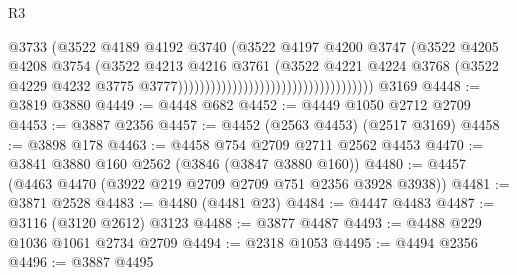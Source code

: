 \begin{lexlean}{R3}
\begin{coremodule}
                                                                @3733
                                                                (@3522
                                                                  @4189
                                                                  @4192
                                                                  @3740
                                                                  (@3522
                                                                    @4197
                                                                    @4200
                                                                    @3747
                                                                    (@3522
                                                                      @4205
                                                                      @4208
                                                                      @3754
                                                                      (@3522
                                                                        @4213
                                                                        @4216
                                                                        @3761
                                                                        (@3522
                                                                          @4221
                                                                          @4224
                                                                          @3768
                                                                          (@3522
                                                                            @4229
                                                                            @4232
                                                                            @3775
                                                                            @3777))))))))))))))))))))))))))))))))))))
    @3169
@4448 := @3819 @3880
@4449 := @4448 @682
@4452 := @4449 @1050 @2712 @2709
@4453 := @3887 @2356
@4457 := @4452 (@2563 @4453) (@2517 @3169)
@4458 := @3898 @178
@4463 := @4458 @754 @2709 @2711 @2562 @4453
@4470 := @3841 @3880 @160 @2562 (@3846 (@3847 @3880 @160))
@4480 := @4457 (@4463 @4470 (@3922 @219 @2709 @2709 @751 @2356 @3928 @3938))
@4481 := @3871 @2528
@4483 := @4480 (@4481 @23)
@4484 := @4447 @4483
@4487 := @3116 (@3120 @2612) @3123
@4488 := @3877 @4487
@4493 := @4488 @229 @1036 @1061 @2734 @2709
@4494 := @2318 @1053
@4495 := @4494 @2356
@4496 := @3887 @4495

\end{coremodule}
\end{lexlean}
